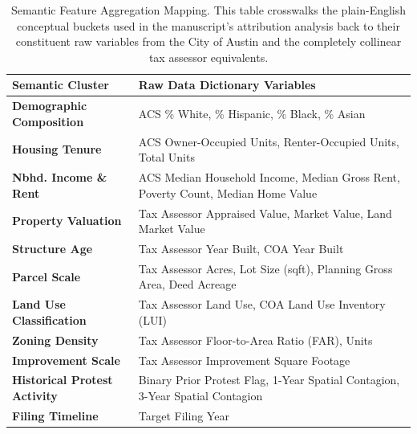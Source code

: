 \begin{table}[htbp]
    \centering
    \caption[Semantic Feature Aggregation Mapping]{Semantic Feature Aggregation Mapping. This table crosswalks the plain-English conceptual buckets used in the manuscript's attribution analysis back to their constituent raw variables from the City of Austin and the completely collinear tax assessor equivalents.}
    \label{tab:semantic_mapping}
    \renewcommand{\arraystretch}{1.3}
    \begin{tabular}{@{}p{} p{}@{}}
        \toprule
        \textbf{Semantic Cluster}          & \textbf{Raw Data Dictionary Variables} \\ 
        \midrule
        \textbf{Demographic Composition}   & ACS \% White, \% Hispanic, \% Black, \% Asian \\
        \textbf{Housing Tenure}            & ACS Owner-Occupied Units, Renter-Occupied Units, Total Units \\
        \textbf{Nbhd. Income \& Rent}      & ACS Median Household Income, Median Gross Rent, Poverty Count, Median Home Value \\
        \textbf{Property Valuation}        & Tax Assessor Appraised Value, Market Value, Land Market Value \\
        \textbf{Structure Age}             & Tax Assessor Year Built, COA Year Built \\
        \textbf{Parcel Scale}              & Tax Assessor Acres, Lot Size (sqft), Planning Gross Area, Deed Acreage \\
        \textbf{Land Use Classification}   & Tax Assessor Land Use, COA Land Use Inventory (LUI) \\
        \textbf{Zoning Density}            & Tax Assessor Floor-to-Area Ratio (FAR), Units \\
        \textbf{Improvement Scale}         & Tax Assessor Improvement Square Footage \\
        \textbf{Historical Protest Activity} & Binary Prior Protest Flag, 1-Year Spatial Contagion, 3-Year Spatial Contagion \\
        \textbf{Filing Timeline}           & Target Filing Year \\
        \bottomrule
    \end{tabular}
\end{table}
